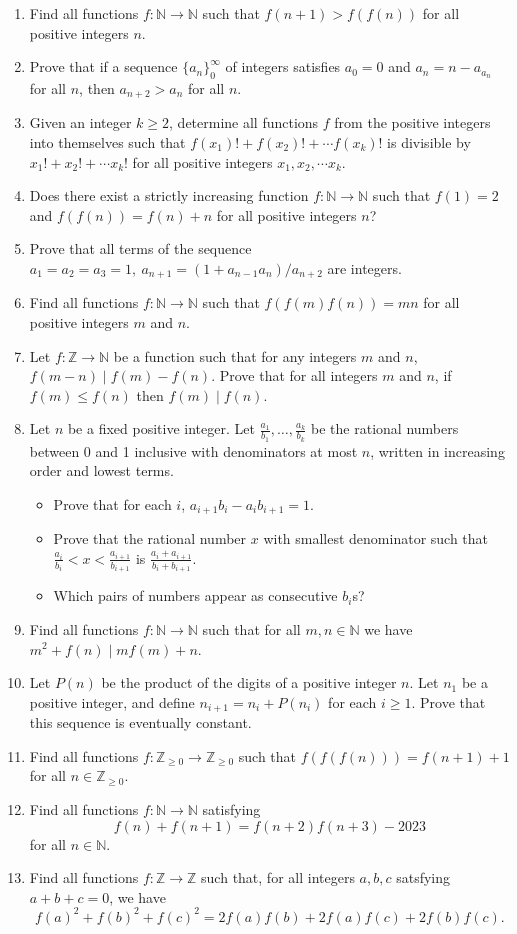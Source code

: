 \documentclass{article}
\newcommand\Nn{\mathbb{N}}
\newcommand\Zz{\mathbb{Z}}
\begin{document}
\begin{enumerate}
  \item Find all functions $f:\Nn\to\Nn$ such that $f(n+1)>f(f(n))$ for all
    positive integers $n$.
  \item Prove that if a sequence $\{a_n\}_0^\infty$ of integers satisfies
    $a_0=0$ and $a_n=n-a_{a_n}$ for all $n$, then $a_{n+2}>a_n$ for all $n$.
  \item Given an integer $k\geq 2$, determine all functions $f$ from the
    positive integers into themselves such that $f(x_1)!+f(x_2)!+\cdots f(x_k)!$
    is divisible by $x_1!+x_2!+\cdots x_k!$ for all positive integers
    $x_1,x_2,\cdots x_k$.
  \item Does there exist a strictly increasing function $f:\Nn\to\Nn$ such that
    $f(1)=2$ and $f(f(n))=f(n)+n$ for all positive integers $n$?
  \item Prove that all terms of the sequence $a_1=a_2=a_3=1,\
    a_{n+1}=(1+a_{n-1}a_n)/a_{n+2}$ are integers.
  \item Find all functions $f:\Nn\to\Nn$ such that $f(f(m)f(n))=mn$ for all
    positive integers $m$ and $n$.
  \item Let $f:\Zz\to\Nn$ be a function such that for any integers $m$ and $n$,
    $f(m-n)\mid f(m)-f(n)$. Prove that for all integers $m$ and $n$, if $f(m)\le
    f(n)$ then $f(m)\mid f(n)$.
  \item Let $n$ be a fixed positive integer. Let
    $\frac{a_1}{b_1},\ldots,\frac{a_k}{b_k}$ be the rational numbers between 0
    and 1 inclusive with denominators at most $n$, written in increasing order
    and lowest terms.
    \begin{itemize}
      \item Prove that for each $i$, $a_{i+1}b_i-a_i b_{i+1}=1$.
      \item Prove that the rational number $x$ with smallest denominator such
        that $\frac{a_i}{b_i}<x<\frac{a_{i+1}}{b_{i+1}}$ is
        $\frac{a_i+a_{i+1}}{b_i+b_{i+1}}$. 
      \item Which pairs of numbers appear as consecutive $b_i$s?
    \end{itemize}
  \item Find all functions $f:\Nn\to\Nn$ such that for all $m, n\in\Nn$ we have
    $m^2+f(n)\mid mf(m)+n$.
  \item Let $P(n)$ be the product of the digits of a positive integer $n$.
    Let $n_1$ be a positive integer, and define $n_{i+1}=n_i+P(n_i)$ for each
    $i\ge 1$. Prove that this sequence is eventually constant.
  \item Find all functions $f:\Zz_{\ge 0}\to \Zz_{\ge 0}$ such that
    $f(f(f(n)))=f(n+1)+1$ for all $n\in\Zz_{\ge 0}$.
  \item Find all functions $f:\mathbb N\to\mathbb N$ satisfying 
    \[f(n)+f(n+1)=f(n+2)f(n+3)-2023\]
    for all $n\in\mathbb N$.
  \item Find all functions $f:\Zz\to\Zz$ such that, for all integers $a,b,c$
    satsfying $a+b+c=0$, we have
    \[f(a)^2+f(b)^2+f(c)^2=2f(a)f(b)+2f(a)f(c)+2f(b)f(c).\]
\end{enumerate}
\newpage
\end{document}
